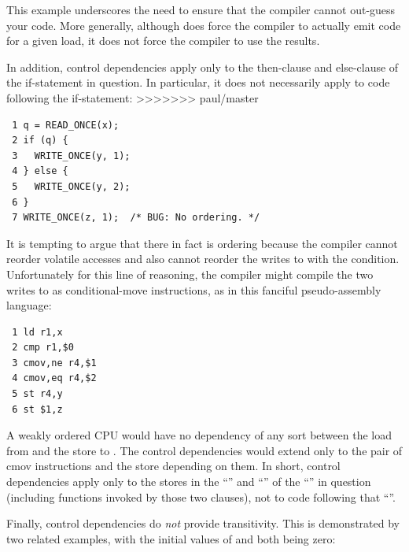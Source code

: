 \begin{enumerate}
This example underscores the need to ensure that the compiler cannot
out-guess your code.
More generally, although  does force
the compiler to actually emit code for a given load, it does not force
the compiler to use the results.

In addition, control dependencies apply only to the then-clause and
else-clause of the if-statement in question.
In particular, it does
not necessarily apply to code following the if-statement:
>>>>>>> paul/master

\vspace{5pt}
\begin{minipage}[t]{\columnwidth}
\scriptsize
\begin{verbatim}
 1 q = READ_ONCE(x);
 2 if (q) {
 3   WRITE_ONCE(y, 1);
 4 } else {
 5   WRITE_ONCE(y, 2);
 6 }
 7 WRITE_ONCE(z, 1);  /* BUG: No ordering. */
\end{verbatim}
\end{minipage}
\vspace{5pt}

It is tempting to argue that there in fact is ordering because the
compiler cannot reorder volatile accesses and also cannot reorder
the writes to  with the condition.
Unfortunately for this line
of reasoning, the compiler might compile the two writes to  as
conditional-move instructions, as in this fanciful pseudo-assembly
language:

\vspace{5pt}
\begin{minipage}[t]{\columnwidth}
\scriptsize
\begin{verbatim}
 1 ld r1,x
 2 cmp r1,$0
 3 cmov,ne r4,$1
 4 cmov,eq r4,$2
 5 st r4,y
 6 st $1,z
\end{verbatim}
\end{minipage}
\vspace{5pt}

A weakly ordered CPU would have no dependency of any sort between the load
from  and the store to .
The control dependencies would extend
only to the pair of cmov instructions and the store depending on them.
In short, control dependencies apply only to the stores in the ``''
and ``'' of the ``'' in question (including functions
invoked by those two clauses), not to code following that ``''.

Finally, control dependencies do \emph{not} provide transitivity.
This is demonstrated by two related examples, with the initial values of
 and  both being zero:


\end{enumerate}

